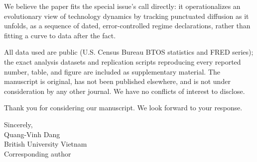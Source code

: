 \documentclass[11pt]{article}
\begin{document}
We believe the paper fits the special issue's call directly: it operationalizes an evolutionary view of technology dynamics by tracking punctuated diffusion as it unfolds, as a sequence of dated, error-controlled regime declarations, rather than fitting a curve to data after the fact.

All data used are public (U.S. Census Bureau BTOS statistics and FRED series); the exact analysis datasets and replication scripts reproducing every reported number, table, and figure are included as supplementary material. The manuscript is original, has not been published elsewhere, and is not under consideration by any other journal. We have no conflicts of interest to disclose.

Thank you for considering our manuscript. We look forward to your response.

\vspace{14pt}
\noindent Sincerely,\\[6pt]
Quang-Vinh Dang\\
British University Vietnam\\
Corresponding author
\end{document}
